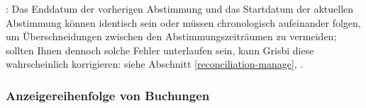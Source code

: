 \Attention{}: Das Enddatum der vorherigen Abstimmung und das Startdatum der aktuellen Abstimmung können identisch sein oder müssen chronologisch aufeinander folgen, um Überschneidungen zwischen den Abstimmungszeiträumen zu vermeiden; sollten Ihnen dennoch solche Fehler unterlaufen sein, kann Grisbi diese wahrscheinlich korrigieren: siehe Abschnitt \vref{reconciliation-manage}, .


\subsubsection{Anzeigereihenfolge von Buchungen\label{reconciliation-account-description-sort}}

